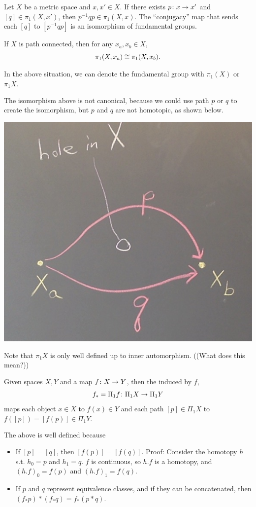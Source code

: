 \documentclass[11pt,leqno,oneside]{amsart}
\numberwithin{thm}{section}
\begin{document}
\begin{thm}[Hatcher 1.5]
  Let $X$ be a metric space and $x,x' \in X$.  If there exists
  $p\colon x \to x'$ and $[q] \in \pi_1(X,x')$, then
  $p^{-1}qp \in \pi_1(X,x)$.  The ``conjugacy'' map that sends each $[q]$ to $[p^{-1}qp]$ is an isomorphism of fundamental groups.
\end{thm}
\begin{thm}
  If $X$ is path connected, then for any $x_a, x_b \in X$,
  $$\pi_1(X, x_a) \mathrel{\cong} \pi_1(X, x_b).$$
\end{thm}
In the above situation, we can denote the fundamental
group with $\pi_1(X)$ or $\pi_1 X$.
\begin{example}
  The isomorphism above is not canonical, because we could use path $p$ or $q$ to create the isomorphism, but $p$ and $q$ are not homotopic, as shown below.

  \includegraphics[scale=0.2]{images/isomorphism-not-canonical}

  Note that $\pi_1 X$ is only well defined up to inner automorphism.  ((What does this mean?))
\end{example}
\begin{defn}
  Given spaces $X, Y$ and a map $f\colon X \to Y$, then the
   induced by $f$,
  $$f_* = \Pi_1 f \colon \Pi_1 X \to \Pi_1 Y$$ maps each object $x \in X$
  to $f(x) \in Y$ and each path $[p] \in \Pi_1 X$ to
  $f([p]) = [f(p)] \in \Pi_1 Y$.
\end{defn}
\begin{prop}
  The above is well defined because
  \begin{itemize}
  \item If $[p]=[q]$, then $[f(p)] = [f(q)]$.  Proof:  Consider the homotopy $h$ s.t. $h_0 = p$ and $h_1 = q$.  $f$ is continuous, so $h.f$ is a homotopy, and $(h.f)_0 = f(p)$ and $(h.f)_1 = f(q)$.
  \item If $p$ and $q$ represent equivalence classes, and if they can be concatenated, then $(f_*p)*(f_*q) = f_*(p*q)$.
  \end{itemize}
\end{prop}
\end{document}
